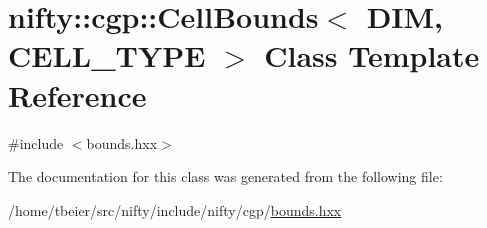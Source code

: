 \hypertarget{classnifty_1_1cgp_1_1CellBounds}{}\section{nifty\+:\+:cgp\+:\+:Cell\+Bounds$<$ D\+IM, C\+E\+L\+L\+\_\+\+T\+Y\+PE $>$ Class Template Reference}
\label{classnifty_1_1cgp_1_1CellBounds}


{\ttfamily \#include $<$bounds.\+hxx$>$}



The documentation for this class was generated from the following file\+:\begin{DoxyCompactItemize}
\item 
/home/tbeier/src/nifty/include/nifty/cgp/\hyperlink{bounds_8hxx}{bounds.\+hxx}\end{DoxyCompactItemize}

